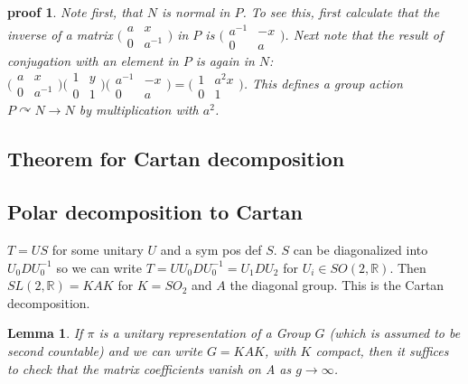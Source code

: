 \documentclass[
  12pt
]{article}
\theoremstyle{break}
\theoremstyle{plain}
\newtheorem{lem}[thm]{Lemma}
\newtheorem*{pf}{proof}
\newcommand{\ipmatrix}[1]{%
\ensuremath{\big(\begin{smallmatrix} #1 \end{smallmatrix}\big)}\xspace}
\begin{document}
\begin{pf}
    Note first, that $N$ is normal in $P$. To see this, first calculate that the
    inverse of a matrix $\ipmatrix{ a & x \\ 0 & a^{-1} }$ in $P$ is $\ipmatrix{
    a^{-1} & -x \\ 0 & a }$. Next note that the result of conjugation with an
    element in $P$ is again in $N$: $\ipmatrix{ a & x \\ 0 & a^{-1} } \ipmatrix{1 &
    y \\ 0 & 1} \ipmatrix{ a^{-1} & -x \\ 0 & a } = \ipmatrix{1 & a^2x \\ 0 & 1}$.
    This defines a group action $P \curvearrowright N \rightarrow N$ by
    multiplication with $a^2$.
  \end{pf}



  \hypertarget{theorem-for-cartan-decomposition}{%
  \subsection{Theorem for Cartan
  decomposition}\label{theorem-for-cartan-decomposition}}

  \hypertarget{polar-decomposition-to-cartan}{%
  \subsection{Polar decomposition to Cartan}
  \label{polar-decomposition-to-cartan}}

  $T = US$ for some unitary $U$ and a sym pos def $S$. $S$ can be
  diagonalized into $U_0 D U_0^{-1}$ so we can write
  $T = U U_0 D U_0^{-1} = U_1 D U_2$ for $U_i \in SO(2, \mathbb{R})$.
  Then $SL(2, \mathbb{R}) = KAK$ for $K = SO_2$ and $A$ the diagonal
  group. This is the Cartan decomposition.





  \begin{lem}
    \label{lemma}
    If $\pi$ is a unitary representation of a Group $G$ (which is assumed to be second countable) and we can write $G =
    KAK$, with $K$ compact, then it suffices to check that the matrix
    coefficients vanish on A as $g \rightarrow \infty$.
  \end{lem}
\end{document}
